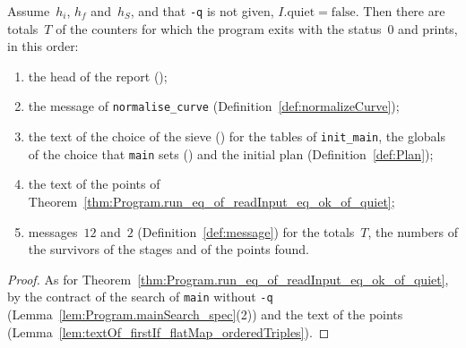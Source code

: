 \begin{theorem}\label{thm:Program.exists_run_eq_of_readInput_eq_ok_of_quiet_eq_false}
  \leanok
  Assume~$h_i$, $h_f$ and~$h_S$, and that \texttt{-q} is not given,
  $I.\mathrm{quiet} = \mathrm{false}$. Then there are totals~$T$ of the counters for which the
  program exits with the status~$0$ and prints, in this order:
  \begin{enumerate}
    \item the head of the report ();
    \item the message of \texttt{normalise\_curve} (Definition~\ref{def:normalizeCurve});
    \item the text of the choice of the sieve () for the tables of
      \texttt{init\_main}, the globals of the choice that \texttt{main} sets
      () and the initial plan (Definition~\ref{def:Plan});
    \item the text of the points of
      Theorem~\ref{thm:Program.run_eq_of_readInput_eq_ok_of_quiet};
    \item messages~$12$ and~$2$ (Definition~\ref{def:message}) for the totals~$T$, the numbers of
      the survivors of the stages and of the points found.
  \end{enumerate}
\end{theorem}

\begin{proof}
  \leanok
  As for Theorem~\ref{thm:Program.run_eq_of_readInput_eq_ok_of_quiet}, by the contract of the
  search of \texttt{main} without \texttt{-q} (Lemma~\ref{lem:Program.mainSearch_spec}(2)) and the
  text of the points (Lemma~\ref{lem:textOf_firstIf_flatMap_orderedTriples}).
\end{proof}


